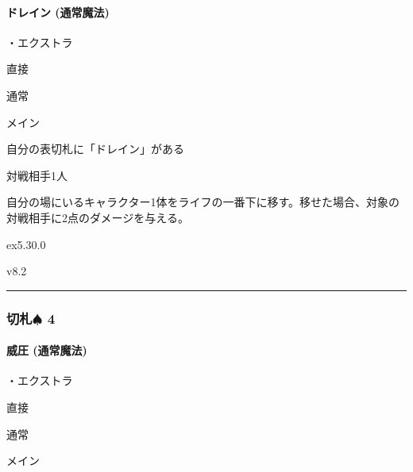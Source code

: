 \documentclass[letterpaper,10pt,dvipdfmx]{sphinxmanual}
\begin{document}
\paragraph{ドレイン (通常魔法)}
\label{\detokenize{auto/frameActionlist:act-drain}}\label{\detokenize{auto/frameActionlist:id18}}
\sphinxAtStartPar
{}

\sphinxAtStartPar
・エクストラ

\sphinxAtStartPar
{} 直接

\sphinxAtStartPar
{} 通常

\sphinxAtStartPar
{} メイン

\sphinxAtStartPar
{}

\sphinxAtStartPar
自分の表切札に「ドレイン」がある

\sphinxAtStartPar
{}

\sphinxAtStartPar
対戦相手1人

\sphinxAtStartPar
{}

\sphinxAtStartPar
自分の場にいるキャラクター1体をライフの一番下に移す。移せた場合、対象の対戦相手に2点のダメージを与える。

\sphinxAtStartPar
{}  ex5.30.0

\sphinxAtStartPar
{}  v8.2


\bigskip\hrule\bigskip



\subsubsection{切札{\normalsize $\spadesuit$} 4}
\label{\detokenize{auto/frameActionlist:id19}}

\paragraph{威圧 (通常魔法)}
\label{\detokenize{auto/frameActionlist:act-intimidate}}\label{\detokenize{auto/frameActionlist:id20}}
\sphinxAtStartPar
{}

\sphinxAtStartPar
・エクストラ

\sphinxAtStartPar
{} 直接

\sphinxAtStartPar
{} 通常

\sphinxAtStartPar
{} メイン
\end{document}

